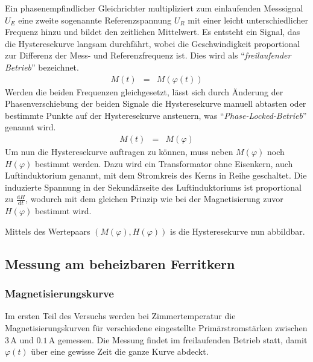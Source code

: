 \documentclass[12pt,a4paper]{scrartcl}
\numberwithin{equation}{section} %
\renewcommand{\[}{} %
\renewcommand{\]}{\noindent} %
\begin{document}
\hypertarget{bestimmung-von-mvarphi}{\label{bestimmung-von-mvarphi}}
Ein phasenempfindlicher Gleichrichter multipliziert zum einlaufenden Messsignal \(U_E\) eine zweite sogenannte Referenzspannung \(U_R\) mit einer leicht unterschiedlicher Frequenz hinzu und bildet den zeitlichen Mittelwert. Es entsteht ein Signal, das die Hysteresekurve langsam durchfährt, wobei die Geschwindigkeit proportional zur Differenz der Mess- und Referenzfrequenz ist. Dies wird als ``\emph{freilaufender Betrieb}'' bezeichnet.
\begin{eqnarray}
    M(t) &=& M(\varphi(t))
\end{eqnarray}
Werden die beiden Frequenzen gleichgesetzt, lässt sich durch Änderung der Phasenverschiebung der beiden Signale die Hysteresekurve manuell abtasten oder bestimmte Punkte auf der Hysteresekurve ansteuern, was ``\emph{Phase-Locked-Betrieb}'' genannt wird.
\begin{eqnarray}
    M(t) &=& M(\varphi)
\end{eqnarray}
\hypertarget{bestimmung-von-hvarphi}{\label{bestimmung-von-hvarphi}}Um nun die Hysteresekurve auftragen zu können, muss neben \(M(\varphi)\) noch \(H(\varphi)\) bestimmt werden. Dazu wird ein Transformator ohne Eisenkern, auch Luftinduktorium genannt, mit dem Stromkreis des Kerns in Reihe geschaltet. Die induzierte Spannung in der Sekundärseite des Luftinduktoriums ist proportional zu \(\frac{\mathrm dH}{\mathrm dt}\), wodurch mit dem gleichen Prinzip wie bei der Magnetisierung zuvor \(H(\varphi)\) bestimmt wird.

Mittels des Wertepaars \((M(\varphi), H(\varphi))\) is die Hysteresekurve nun abbildbar.

\hypertarget{messung-am-beheizbaren-ferritkern}{%
\subsection{Messung am beheizbaren Ferritkern}\label{messung-am-beheizbaren-ferritkern}}

\hypertarget{magnetisierungskurve}{%
\subsubsection{Magnetisierungskurve}\label{magnetisierungskurve}}
Im ersten Teil des Versuchs werden bei Zimmertemperatur die Magnetisierungskurven für verschiedene eingestellte Primärstromstärken zwischen \(3\,\mathrm A\) und \(0.1\,\mathrm A\) gemessen. Die Messung findet im freilaufenden Betrieb statt, damit \(\varphi(t)\) über eine gewisse Zeit die ganze Kurve abdeckt.
\end{document}
